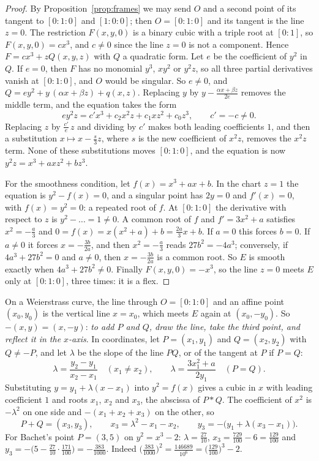\begin{proof}
By Proposition~\ref{prop:frames} we may send $O$ and a second point of its tangent to $[0:1:0]$ and $[1:0:0]$; then $O=[0:1:0]$ and its tangent is
the line $z=0$. The restriction $F(x,y,0)$ is a binary cubic with a triple root at $[0:1]$, so $F(x,y,0)=cx^3$, and $c\ne0$ since the line $z=0$
is not a component. Hence $F=cx^3+zQ(x,y,z)$ with $Q$ a quadratic form. Let $e$ be the coefficient of $y^2$ in $Q$. If $e=0$, then $F$ has no monomial
$y^3$, $xy^2$ or $y^2z$, so all three partial derivatives vanish at $[0:1:0]$, and $O$ would be singular. So $e\ne0$, and $Q=ey^2+y\,(\alpha x+\beta z)+q(x,z)$.
Replacing $y$ by $y-\frac{\alpha x+\beta z}{2e}$ removes the middle term, and the equation takes the form
\[
ey^2z=c'x^3+c_2x^2z+c_1xz^2+c_0z^3,\qquad c'=-c\ne0.
\]
Replacing $z$ by $\frac{c'}e\,z$ and dividing by $c'$ makes both leading coefficients $1$, and then a substitution $x\mapsto x-\frac s3z$, where $s$ is the
new coefficient of $x^2z$, removes the $x^2z$ term. None of these
substitutions moves $[0:1:0]$, and the equation is now $y^2z=x^3+axz^2+bz^3$.

For the smoothness condition, let $f(x)=x^3+ax+b$. In the chart $z=1$ the equation is $y^2-f(x)=0$, and a singular point has $2y=0$ and $f'(x)=0$, with
$f(x)=y^2=0$: a repeated root of $f$. At $[0:1:0]$ the derivative with respect to $z$ is $y^2-\dots=1\ne0$. A common root of $f$ and $f'=3x^2+a$ satisfies
$x^2=-\frac a3$ and $0=f(x)=x(x^2+a)+b=\frac{2a}3x+b$. If $a=0$ this forces $b=0$. If $a\ne0$ it forces $x=-\frac{3b}{2a}$, and then $x^2=-\frac a3$ reads
$27b^2=-4a^3$; conversely, if $4a^3+27b^2=0$ and $a\ne0$, then $x=-\frac{3b}{2a}$ is a common root. So $E$ is smooth exactly when $4a^3+27b^2\ne0$. Finally
$F(x,y,0)=-x^3$, so the line $z=0$ meets $E$ only at $[0:1:0]$, three times: it is a flex.
\end{proof}

On a Weierstrass curve, the line through $O=[0:1:0]$ and an affine point $(x_0,y_0)$ is the vertical line $x=x_0$, which meets $E$ again at $(x_0,-y_0)$.
So $-(x,y)=(x,-y)$: \emph{to add $P$ and $Q$, draw the line, take the third point, and reflect it in the $x$-axis}. In coordinates, let $P=(x_1,y_1)$ and
$Q=(x_2,y_2)$ with $Q\ne-P$, and let $\lambda$ be the slope of the line $PQ$, or of the tangent at $P$ if $P=Q$:
\[
\lambda=\frac{y_2-y_1}{x_2-x_1}\quad(x_1\ne x_2),\qquad\lambda=\frac{3x_1^2+a}{2y_1}\quad(P=Q).
\]
Substituting $y=y_1+\lambda(x-x_1)$ into $y^2=f(x)$ gives a cubic in $x$ with leading coefficient $1$ and roots $x_1$, $x_2$ and $x_3$, the abscissa of $P*Q$. The
coefficient of $x^2$ is $-\lambda^2$ on one side and $-(x_1+x_2+x_3)$ on the other, so
\[
P+Q=(x_3,y_3),\qquad x_3=\lambda^2-x_1-x_2,\qquad y_3=-\bigl(y_1+\lambda(x_3-x_1)\bigr).
\]
For Bachet's point $P=(3,5)$ on $y^2=x^3-2$: $\lambda=\frac{27}{10}$, $x_3=\frac{729}{100}-6=\frac{129}{100}$ and $y_3=-\bigl(5-\frac{27}{10}\cdot\frac{171}{100}\bigr)
=-\frac{383}{1000}$. Indeed $\bigl(\frac{383}{1000}\bigr)^2=\frac{146689}{10^6}=\bigl(\frac{129}{100}\bigr)^3-2$.

